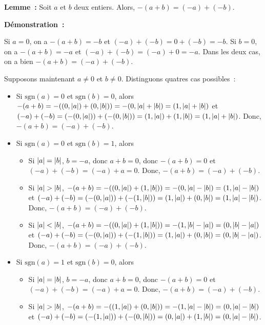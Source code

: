    \done

\medskip

\noindent\textbf{Lemme :} Soit $a$ et $b$ deux entiers. 
    Alors, $-(a+b) = (-a) + (-b)$. 

\medskip

\noindent\textbf{Démonstration :} 

Si $a = 0$, on a $-(a+b) = -b$ et $(-a) + (-b) = 0 + (-b) = -b$. 
Si $b = 0$, on a $-(a+b) = -a$ et $(-a) + (-b) = (-a) + 0 = -a$. 
Dans les deux cas, on a bien $-(a+b) = (-a) + (-b)$.

Supposons maintenant $a \neq 0$ et $b \neq 0$. 
Distinguons quatres cas possibles : 
\begin{itemize}[nosep]
    \item Si $\mathrm{sgn}(a) = 0$ et $\mathrm{sgn}(b) = 0$, alors $-(a+b) = -((0,\abs{a}) + (0, \abs{b})) = -(0, \abs{a}+\abs{b}) = (1, \abs{a} + \abs{b})$ et $(-a) + (-b) = (-(0,\abs{a})) + (-(0, \abs{b})) = (1, \abs{a}) + (1, \abs{b}) = (1, \abs{a} + \abs{b})$.
        Donc, $-(a+b) = (-a) + (-b)$.
    \item Si $\mathrm{sgn}(a) = 0$ et $\mathrm{sgn}(b) = 1$, alors
        \begin{itemize}[nosep]
            \item Si $\abs{a} = \abs{b}$, $b = -a$, donc $a + b = 0$, donc $-(a+b) = 0$ et $(-a) + (-b) = (-a) + a = 0$.
                Donc, $-(a+b) = (-a) + (-b)$.
            \item Si $\abs{a} > \abs{b}$, $-(a+b) = -((0,\abs{a}) + (1, \abs{b})) = -(0, \abs{a} - \abs{b}) = (1, \abs{a} - \abs{b})$ et $(-a) + (-b) = (-(0, \abs{a})) + (-(1, \abs{b})) = (1, \abs{a}) + (0, \abs{b}) = (1, \abs{a} - \abs{b})$.
                Donc, $-(a+b) = (-a) + (-b)$.
            \item Si $\abs{a} < \abs{b}$, $-(a+b) = -((0,\abs{a}) + (1, \abs{b})) = -(1, \abs{b} - \abs{a}) = (0, \abs{b} - \abs{a})$ et $(-a) + (-b) = (-(0, \abs{a})) + (-(1, \abs{b})) = (1, \abs{a}) + (0, \abs{b}) = (0, \abs{b} - \abs{a})$.
                Donc, $-(a+b) = (-a) + (-b)$.
        \end{itemize}
    \item Si $\mathrm{sgn}(a) = 1$ et $\mathrm{sgn}(b) = 0$, alors
        \begin{itemize}[nosep]
            \item Si $\abs{a} = \abs{b}$, $b = -a$, donc $a + b = 0$, donc $-(a+b) = 0$ et $(-a) + (-b) = (-a) + a = 0$.
                Donc, $-(a+b) = (-a) + (-b)$.
            \item Si $\abs{a} > \abs{b}$, $-(a+b) = -((1,\abs{a}) + (0, \abs{b})) = -(1, \abs{a} - \abs{b}) = (0, \abs{a} - \abs{b})$ et $(-a) + (-b) = (-(1, \abs{a})) + (-(0, \abs{b})) = (0, \abs{a}) + (1, \abs{b}) = (0, \abs{a} - \abs{b})$.

\end{itemize}
\end{itemize}
